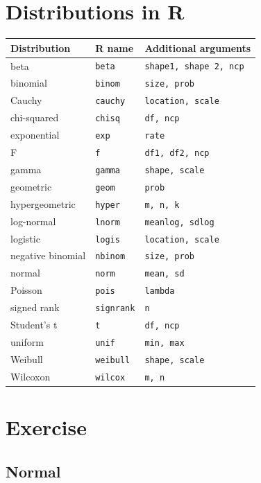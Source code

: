 \documentclass[
]{book}
\begin{document}
\hypertarget{distributions-in-r}{%
\section{Distributions in R}\label{distributions-in-r}}

\begin{longtable}[]{@{}lll@{}}
\toprule()
Distribution & R name & Additional arguments \\
\midrule()
\endhead
beta & \texttt{beta} & \texttt{shape1,\ shape\ 2,\ ncp} \\
binomial & \texttt{binom} & \texttt{size,\ prob} \\
Cauchy & \texttt{cauchy} & \texttt{location,\ scale} \\
chi-squared & \texttt{chisq} & \texttt{df,\ ncp} \\
exponential & \texttt{exp} & \texttt{rate} \\
F & \texttt{f} & \texttt{df1,\ df2,\ ncp} \\
gamma & \texttt{gamma} & \texttt{shape,\ scale} \\
geometric & \texttt{geom} & \texttt{prob} \\
hypergeometric & \texttt{hyper} & \texttt{m,\ n,\ k} \\
log-normal & \texttt{lnorm} & \texttt{meanlog,\ sdlog} \\
logistic & \texttt{logis} & \texttt{location,\ scale} \\
negative binomial & \texttt{nbinom} & \texttt{size,\ prob} \\
normal & \texttt{norm} & \texttt{mean,\ sd} \\
Poisson & \texttt{pois} & \texttt{lambda} \\
signed rank & \texttt{signrank} & \texttt{n} \\
Student's t & \texttt{t} & \texttt{df,\ ncp} \\
uniform & \texttt{unif} & \texttt{min,\ max} \\
Weibull & \texttt{weibull} & \texttt{shape,\ scale} \\
Wilcoxon & \texttt{wilcox} & \texttt{m,\ n} \\
\bottomrule()
\end{longtable}

\hypertarget{exercise}{%
\section{Exercise}\label{exercise}}

\hypertarget{normal}{%
\subsection{Normal}\label{normal}}
\end{document}
